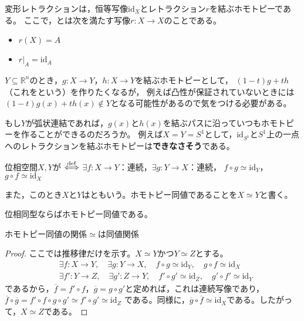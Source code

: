 \documentclass[uplatex]{jsarticle}
\renewcommand{\restriction}[2]{\left. #1 \right|_{#2}}
\begin{document}
\sukima {} 変形レトラクションは，恒等写像$\mathrm{id}_{X}$とレトラクション$r$を結ぶホモトピーである。
ここで，とは次を満たす写像$r \colon X \longrightarrow X$のことである。
\begin{itemize}
  \vspace{-0.5\baselineskip}
  \item $r(X) = A$
  \item $\restriction{r}{A} = \mathrm{id}_{A}$
\end{itemize}

\sukima {} $Y \subseteq \mathbb{R}^{n}$のとき，$g \colon X \longrightarrow Y$，$h \colon X \longrightarrow Y$を結ぶホモトピーとして，
$(1-t)g+th$（これをという）を作りたくなるが，
例えば凸性が保証されていないときには$(1-t)g(x) + t h(x) \notin Y$となる可能性があるので気をつける必要がある。

\sukima {} もし$Y$が弧状連結であれば，$g(x)$と$h(x)$を結ぶパスに沿っていつもホモトピーを作ることができるのだろうか。
例えば$X = Y = S^{1}$として，$\mathrm{id}_{S^{1}}$と$S^{1}$上の一点へのレトラクションを結ぶホモトピーは{\bf できなさそう}である。

\sukima {}

\begin{teigi}[ホモトピー同値]
  位相空間$X,Y$が $\overset{\mathrm{def}}{\Longleftrightarrow}$ $\exists f \colon X \longrightarrow Y$：連続，$\exists g \colon Y \longrightarrow X$：連続，
  $f \circ g \simeq \mathrm{id}_{Y}$，$g \circ f \simeq \mathrm{id}_{X}$

  また，このとき$X$と$Y$はともいう。ホモトピー同値であることを$X \simeq Y$と書く。
\end{teigi}

 位相同型ならばホモトピー同値である。

\begin{hodai}
  ホモトピー同値の関係$\simeq$は同値関係
\end{hodai}

\begin{proof}
  ここでは推移律だけを示す。$X \simeq Y$かつ$Y \simeq Z$とする。
  \begin{align}
    &\exists f \colon X \longrightarrow Y, \quad \exists g \colon Y \longrightarrow X, \quad f \circ g \simeq \mathrm{id}_{Y}, \quad g \circ f \simeq \mathrm{id}_{X} \\
    &\exists f' \colon Y \longrightarrow Z, \quad \exists g' \colon Z \longrightarrow Y, \quad f' \circ g' \simeq \mathrm{id}_{Z}, \quad g' \circ f' \simeq \mathrm{id}_{Y}
  \end{align}
  であるから，$\overline{f} = f' \circ f$，$\overline{g} = g \circ g'$と定めれば，これは連続写像であり，
  $\overline{f} \circ \overline{g} = f' \circ f \circ g \circ g' \simeq f' \circ g' \simeq \mathrm{id}_{Z}$
  である。同様に，$\overline{g} \circ \overline{f} \simeq \mathrm{id}_{X}$である。したがって，$X \simeq Z$である。
\end{proof}
\end{document}
